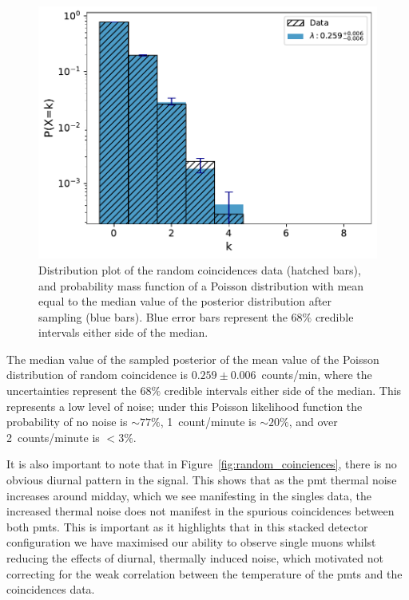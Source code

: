 \begin{figure}[ht!]
	\centering
	\includegraphics[width=0.8\columnwidth]{random_noise_fitted_poisson.pdf}
	\caption{Distribution plot of the random coincidences data (hatched bars), and probability mass function of a Poisson distribution with mean equal to the median value of the posterior distribution after sampling (blue bars). Blue error bars represent the $68 \%$ credible intervals either side of the median.}
	\label{fig:random_coinciences_dist}
\end{figure}

The median value of the sampled posterior of the mean value of the Poisson distribution of random coincidence is $0.259 \pm 0.006$~counts/min, where the uncertainties represent the $68 \%$ credible intervals either side of the median. This represents a low level of noise; under this Poisson likelihood function the probability of no noise is $\sim$$77 \%$, 1~count/minute is $\sim$$20 \%$, and over 2~counts/minute is $< 3 \%$.

It is also important to note that in Figure~\ref{fig:random_coinciences}, there is no obvious diurnal pattern in the signal. This shows that as the \gls{pmt} thermal noise increases around midday, which we see manifesting in the singles data, the increased thermal noise does not manifest in the spurious coincidences between both \glspl{pmt}. This is important as it highlights that in this stacked detector configuration we have maximised our ability to observe single muons whilst reducing the effects of diurnal, thermally induced noise, which motivated not correcting for the weak correlation between the temperature of the \glspl{pmt} and the coincidences data.



